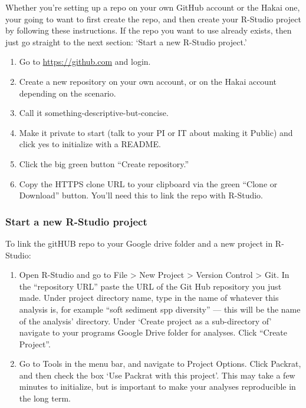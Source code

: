 \documentclass[]{book}
\begin{document}
Whether you're setting up a repo on your own GitHub account or the Hakai
one, your going to want to first create the repo, and then create your
R-Studio project by following these instructions. If the repo you want
to use already exists, then just go straight to the next section: `Start
a new R-Studio project.'

\begin{enumerate}
\def\labelenumi{\arabic{enumi})}
\item
  Go to \url{https://github.com} and login.
\item
  Create a new repository on your own account, or on the Hakai account
  depending on the scenario.
\item
  Call it something-descriptive-but-concise.
\item
  Make it private to start (talk to your PI or IT about making it
  Public) and click yes to initialize with a README.
\item
  Click the big green button ``Create repository.''
\item
  Copy the HTTPS clone URL to your clipboard via the green ``Clone or
  Download'' button. You'll need this to link the repo with R-Studio.
\end{enumerate}

\subsubsection{Start a new R-Studio
project}\label{start-a-new-r-studio-project}

To link the gitHUB repo to your Google drive folder and a new project in
R-Studio:

\begin{enumerate}
\def\labelenumi{\arabic{enumi})}
\item
  Open R-Studio and go to File \textgreater{} New Project \textgreater{}
  Version Control \textgreater{} Git. In the ``repository URL'' paste
  the URL of the Git Hub repository you just made. Under project
  directory name, type in the name of whatever this analysis is, for
  example ``soft sediment spp diversity'' --- this will be the name of
  the analysis' directory. Under `Create project as a sub-directory of'
  navigate to your programs Google Drive folder for analyses. Click
  ``Create Project''.
\item
  Go to Tools in the menu bar, and navigate to Project Options. Click
  Packrat, and then check the box `Use Packrat with this project'. This
  may take a few minutes to initialize, but is important to make your
  analyses reproducible in the long term.
\end{enumerate}
\end{document}
